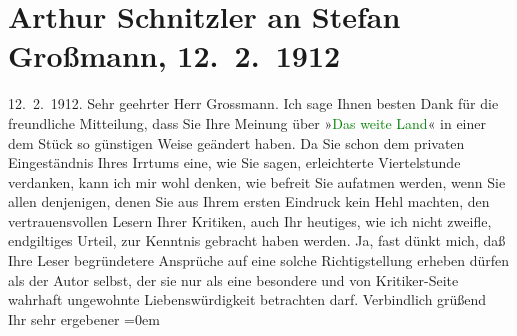 

               \section[Arthur Schnitzler an Stefan Großmann, 12. 2. 1912]{ Arthur Schnitzler an Stefan Großmann, 12. 2. 1912}\nopagebreak{}\rehead{ }\normalsize\beginnumbering{} \toendnotes[C]{\smallbreak\pagebreak[2]} 
\pstart
           \raggedleft{}{\pb}12. 2. 1912.\pend
           \pstart{}Sehr geehrter Herr Grossmann.\pend\pstart
           Ich sage Ihnen besten Dank für die freundliche Mitteilung, dass Sie Ihre Meinung
                    über »\textcolor{green}{Das weite Land}{}\ledrightnote{\textcolor{green}{Das weite Land. Tragikomödie in fünf Akten}}« in einer dem Stück so
                    günstigen Weise geändert haben. Da Sie schon dem privaten Eingeständnis Ihres
                    Irrtums eine, wie Sie sagen, erleichterte Viertelstunde verdanken, kann ich mir
                    wohl denken, wie befreit Sie aufatmen werden, wenn Sie allen denjenigen,
                    {\pb}denen Sie aus Ihrem ersten Eindruck kein Hehl machten, den vertrauensvollen
                    Lesern Ihrer Kritiken, auch Ihr heutiges, wie ich nicht zweifle, endgiltiges
                    Urteil, zur Kenntnis gebracht haben werden. Ja, fast dünkt mich, daß Ihre Leser
                    begründetere Ansprüche auf eine solche Richtigstellung erheben dürfen als der
                    Autor selbst, der sie nur als eine besondere und von Kritiker-Seite wahrhaft
                    ungewohnte Liebenswürdigkeit betrachten darf.\pend
           \pstart
           Verbindlich grüßend{\\[\baselineskip]}Ihr sehr ergebener\pend
           \leftskip=0em{}\endnumbering{}  
      